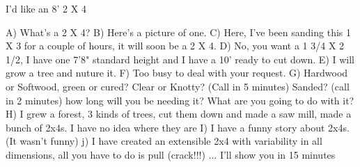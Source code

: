 \documentclass[a4paper,10pt]{article}
\title{}
\author{}
\begin{document}
\maketitle

I'd like an 8'  2 X 4

A) What's a 2 X 4?
B) Here's a picture of one.
C) Here, I've been sanding this 1 X 3 for a couple of hours, it will soon be a 2 X 4.
D) No, you want a 1 3/4 X 2 1/2, I have one 7'8" standard height and I have a 10' ready to cut down.
E) I will grow a tree and nuture it.
F) Too busy to deal with your request.
G) Hardwood or Softwood, green or cured?  Clear or Knotty?  (Call in 5 minutes) Sanded?  (call in 2 minutes) how long will you be needing it?
What are you going to do with it?
H) I grew a forest, 3 kinds of trees, cut them down and made a saw mill, made a bunch of 2x4s. I have no idea where they are
I) I have a funny story about 2x4s.  (It wasn't funny)
j) I have created an extensible 2x4 with variability in all dimensions, all you have to do is pull (crack!!!) ... I'll show you in 15 minutes
\end{document}
